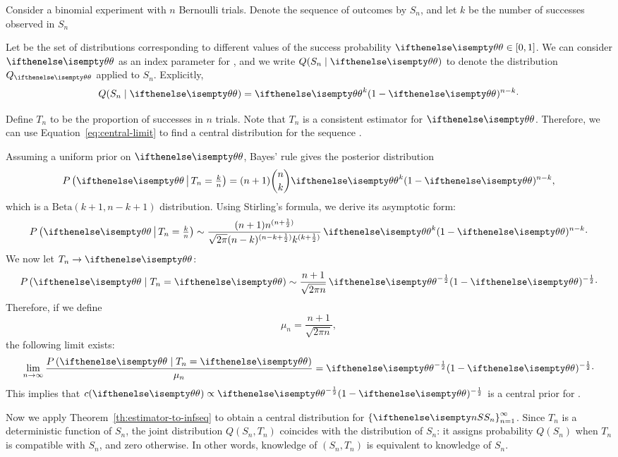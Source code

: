 \begin{example}
    \newcommand{\pv}{\paramVal}
    Consider a binomial experiment with $n$ Bernoulli trials.
    Denote the sequence of outcomes by $S_n$, and let $k$ be the number of successes observed in $S_n$

    Let \setQ be the set of distributions corresponding to different values of the success
    probability $\pv \in [0,1]$.
    We can consider $\pv$ as an index parameter for \setQ, and
    we write $Q(S_n \mid \pv)$ to denote the distribution $Q_{\pv}$ applied to $S_n$.
    Explicitly,
    \[
        Q(S_n \mid \pv) = \pv^k (1-\pv)^{n-k} \cdot
    \]

    Define $T_n$ to be the proportion of successes in $n$ trials.
    Note that $T_n$ is a consistent estimator for $\pv$.
    Therefore, we can use Equation~\ref{eq:central-limit} to find a central distribution for the sequence
    .

    Assuming a uniform prior on $\pv$, Bayes’ rule gives the posterior distribution
    \[
        P\left( \pv \, \middle| \, T_n = \tfrac{k}{n} \right) = (n+1)\binom{n}{k} \pv^k (1 - \pv)^{n - k},
    \]
    which is a $\mathrm{Beta}(k+1, n-k+1)$ distribution.
    Using Stirling’s formula, we derive its asymptotic form:
    \begin{equation*}
        P\left( \pv \, \middle| \, T_n = \tfrac{k}{n} \right) \sim
        \frac{(n+1)n^{(n+\hf)}}{\sqrt{2 \pi} (n-k)^{(n-k+\hf)} k^{(k+\hf)}} \, \pv^k (1 - \pv)^{n - k} \cdot
    \end{equation*}
    We now let $T_n \to \pv$:
    \begin{equation*}
        P\left(\pv \mid T_n = \pv \right) \sim \frac{n+1}{\sqrt{2 \pi n}} \, \pv^{-\hf}(1 - \pv)^{-\hf} \cdot
    \end{equation*}
    Therefore, if we define
    \[
        \mu_n = \frac{n+1}{\sqrt{2 \pi n}},
    \]
    the following limit exists:
    \[
        \toInf \frac{P\left(\pv \mid T_n = \pv \right)}{\mu_n} = \pv^{-\hf}(1 - \pv)^{-\hf} \cdot
    \]
    This implies that $c(\pv) \propto \pv^{-\hf}(1 - \pv)^{-\hf}$ is a central prior for .

    Now we apply Theorem~\ref{th:estimator-to-infseq} to obtain a central distribution for $\infSeq{S}$.
    Since $T_n$ is a deterministic function of $S_n$, the joint distribution $Q(S_n, T_n)$ coincides with the
    distribution of $S_n$: it assigns probability $Q(S_n)$ when $T_n$ is compatible with $S_n$, and zero otherwise.
    In other words, knowledge of $(S_n, T_n)$ is equivalent to knowledge of $S_n$.


\end{example}
